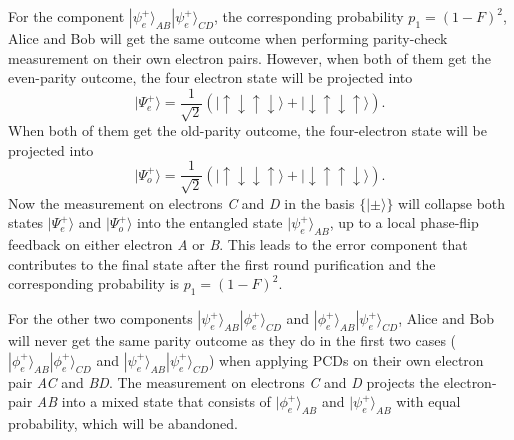 \documentclass[aps,graphicx,twocolumn]{revtex4}%
\begin{document}
For the component $|\psi^{+}_e\rangle_{AB}|\psi^{+}_e\rangle_{CD}$, the corresponding probability $p_1=(1-F)^2$, Alice and Bob will get the same outcome when performing parity-check measurement on their own electron pairs. However, when both of them get the even-parity outcome, the four electron state will be projected into
\begin{equation}\label{four3}
  |\Psi_e^{+}\rangle=\frac{1}{\sqrt2}(|\!\!\uparrow\downarrow\uparrow\downarrow\rangle+
  |\!\!\downarrow\uparrow\downarrow\uparrow\rangle).
\end{equation}
When both of them get the old-parity outcome, the four-electron state will be projected into
\begin{equation}\label{four4}
  |\Psi_o^{+}\rangle=\frac{1}{\sqrt2}(|\!\!\uparrow\downarrow\downarrow\uparrow\rangle+
  |\!\!\downarrow\uparrow\uparrow\downarrow\rangle).
\end{equation}
Now the measurement on  electrons \emph{C} and \emph{D} in the basis $\{|\pm\rangle\}$ will collapse both states $ |\Psi_e^{+}\rangle$ and $ |\Psi_o^{+}\rangle$ into the entangled state $|\psi^{+}_e\rangle_{AB}$, up to a local phase-flip feedback on either electron \emph{A} or \emph{B}. This leads to the error component that contributes to the final state after the first round purification and the corresponding probability is $p_1=(1-F)^2$.


For the other two components $|\psi^{+}_e\rangle_{AB}|\phi^{+}_e\rangle_{CD}$ and $|\phi^{+}_e\rangle_{AB}|\psi^{+}_e\rangle_{CD}$, Alice and Bob will never get the same parity outcome as they do in the first two cases ($|\phi^{+}_e\rangle_{AB}|\phi^{+}_e\rangle_{CD}$ and $|\psi^{+}_e\rangle_{AB}|\psi^{+}_e\rangle_{CD}$) when applying PCDs on their own electron pair \emph{AC} and \emph{BD}. The measurement on  electrons \emph{C} and \emph{D} projects the electron-pair \emph{AB} into a mixed state that consists of $|\phi^{+}_e\rangle_{AB}$ and $|\psi^{+}_e\rangle_{AB}$ with equal probability, which will be abandoned.
\end{document}
